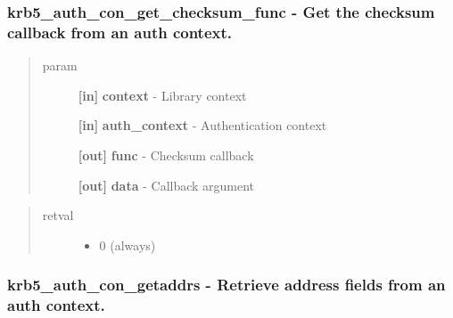 \documentclass[letterpaper,10pt,english]{sphinxmanual}
\begin{document}
\subsubsection{krb5\_auth\_con\_get\_checksum\_func -  Get the checksum callback from an auth context.}
\label{appdev/refs/api/krb5_auth_con_get_checksum_func::doc}\label{appdev/refs/api/krb5_auth_con_get_checksum_func:krb5-auth-con-get-checksum-func-get-the-checksum-callback-from-an-auth-context}

\begin{fulllineitems}
\label{appdev/refs/api/krb5_auth_con_get_checksum_func:krb5_auth_con_get_checksum_func}
\end{fulllineitems}

\begin{quote}\begin{description}
\item[{param}] \leavevmode
\textbf{{[}in{]}} \textbf{context} - Library context

\textbf{{[}in{]}} \textbf{auth\_context} - Authentication context

\textbf{{[}out{]}} \textbf{func} - Checksum callback

\textbf{{[}out{]}} \textbf{data} - Callback argument

\end{description}\end{quote}
\begin{quote}\begin{description}
\item[{retval}] \leavevmode\begin{itemize}
\item {} 
0   (always)

\end{itemize}

\end{description}\end{quote}


\subsubsection{krb5\_auth\_con\_getaddrs -  Retrieve address fields from an auth context.}
\label{appdev/refs/api/krb5_auth_con_getaddrs:krb5-auth-con-getaddrs-retrieve-address-fields-from-an-auth-context}\label{appdev/refs/api/krb5_auth_con_getaddrs::doc}
\end{document}
